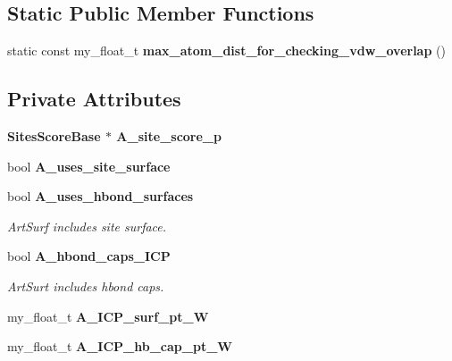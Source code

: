 \subsection*{Static Public Member Functions}
\begin{CompactItemize}
\item 
static const my\_\-float\_\-t \textbf{max\_\-atom\_\-dist\_\-for\_\-checking\_\-vdw\_\-overlap} ()\label{classSimSite3D_1_1IK__tests_06c9e7b5b2840ca8d74bd6582d883c83}

\end{CompactItemize}
\subsection*{Private Attributes}
\begin{CompactItemize}
\item 
\bf{Sites\-Score\-Base} $\ast$ \textbf{A\_\-site\_\-score\_\-p}\label{classSimSite3D_1_1IK__tests_d39cab900cbb424c333c3c51dbbecc0c}

\item 
bool \textbf{A\_\-uses\_\-site\_\-surface}\label{classSimSite3D_1_1IK__tests_b047df9991ddc5f5cfbdd35b245dac06}

\item 
bool \bf{A\_\-uses\_\-hbond\_\-surfaces}\label{classSimSite3D_1_1IK__tests_d7947e90a6605298f42be161830ec40e}

\begin{CompactList}\small\item\em Art\-Surf includes site surface. \item\end{CompactList}\item 
bool \bf{A\_\-hbond\_\-caps\_\-ICP}\label{classSimSite3D_1_1IK__tests_c47ea936905f2ff6b2815129ad205395}

\begin{CompactList}\small\item\em Art\-Surt includes hbond caps. \item\end{CompactList}\item 
my\_\-float\_\-t \textbf{A\_\-ICP\_\-surf\_\-pt\_\-W}\label{classSimSite3D_1_1IK__tests_f66ad10a0abe61813e9cc2dd01887cb1}

\item 
my\_\-float\_\-t \textbf{A\_\-ICP\_\-hb\_\-cap\_\-pt\_\-W}\label{classSimSite3D_1_1IK__tests_1096e6e78d144f78bf891188b0a5e18f}

\end{CompactItemize}
